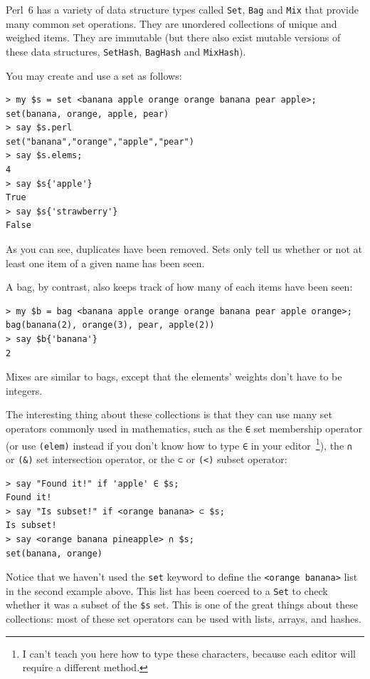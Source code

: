 Perl~6 has a variety of data structure types called {\tt Set}, 
{\tt Bag} and {\tt Mix} that provide many common set 
operations. They are unordered collections of unique and 
weighed items. They are immutable (but there also exist mutable 
versions of these data structures, {\tt SetHash}, {\tt BagHash} 
and {\tt MixHash}).

You may create and use a set as follows:

\begin{verbatim}
> my $s = set <banana apple orange orange banana pear apple>;
set(banana, orange, apple, pear)
> say $s.perl
set("banana","orange","apple","pear")
> say $s.elems;
4
> say $s{'apple'}
True
> say $s{'strawberry'}
False
\end{verbatim}
%
As you can see, duplicates have been removed. Sets only tell us 
whether or not at least one item of a given name has been seen.

A bag, by contrast, also keeps track of how many of each items 
have been seen:

\begin{verbatim}
> my $b = bag <banana apple orange orange banana pear apple orange>;
bag(banana(2), orange(3), pear, apple(2))
> say $b{'banana'}
2
\end{verbatim} 

Mixes are similar to bags, except that the elements' weights don't 
have to be integers.

The interesting thing about these collections is that they can use 
many set operators commonly used in mathematics, such as the 
\verb'∈' set membership operator (or use \verb'(elem)' instead 
if you don't know how to type \verb'∈' in your 
editor~\footnote{I can't teach you here how to type these characters, 
because each editor will require a different method.}), the \verb'∩' or 
\verb'(&)' set intersection operator, or the \verb'⊂' or 
\verb'(<)' subset operator:

\begin{verbatim}
> say "Found it!" if 'apple' ∈ $s;
Found it!
> say "Is subset!" if <orange banana> ⊂ $s;
Is subset!
> say <orange banana pineapple> ∩ $s;
set(banana, orange)
\end{verbatim}

Notice that we haven't used the {\tt set} keyword to define the 
\verb'<orange banana>' list in the second example above. This list 
has been coerced to a {\tt Set} to check whether it was a subset 
of the \verb'$s' set. This is one of the great things about these 
collections: most of these set operators can be used with lists, 
arrays, and hashes.

